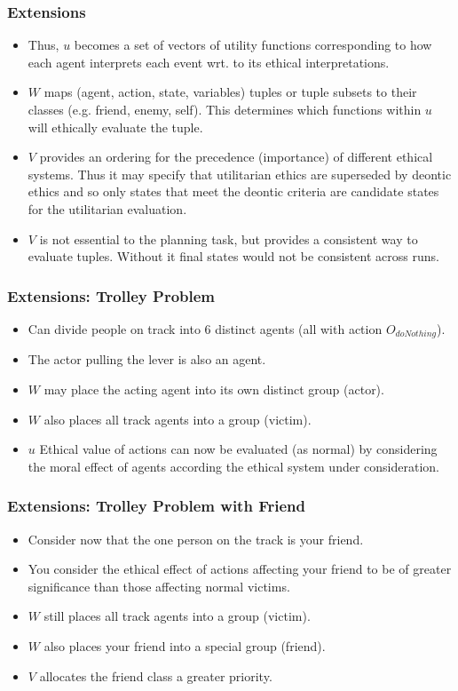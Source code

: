 \documentclass{beamer}
\begin{document}
 
 
\begin{frame}
\frametitle{Extensions}
\begin{itemize}

\item Thus, $u$ becomes a set of vectors of utility functions corresponding to how each agent interprets each event wrt. to its ethical interpretations.
\item $W$ maps (agent, action, state, variables) tuples or tuple subsets to their classes (e.g. friend, enemy, self). This determines which functions within $u$ will ethically evaluate the tuple.
\item $V$ provides an ordering for the precedence (importance) of different ethical systems. Thus it may specify that utilitarian ethics are superseded by deontic ethics and so only states that meet the deontic criteria are candidate states for the utilitarian evaluation.
\item $V$ is not essential to the planning task, but provides a consistent way to evaluate tuples. Without it final states would not be consistent across runs.
\end{itemize}
 \end{frame}
 
 
 \begin{frame}
\frametitle{Extensions: Trolley Problem}
\begin{itemize}
\item Can divide people on track into 6 distinct agents (all with action $O_{doNothing}$).
\item The actor pulling the lever is also an agent.
\item $W$ may place the acting agent into its own distinct group (actor).
\item $W$ also places all track agents into a group (victim).
\item $u$ Ethical value of actions can now be evaluated (as normal) by considering the moral effect of agents according the ethical system under consideration.
\end{itemize}
\end{frame}

 \begin{frame}
\frametitle{Extensions: Trolley Problem with Friend}
\begin{itemize}
\item Consider now that the one person on the track is your friend.
\item You consider the ethical effect of actions affecting your friend to be of greater significance than those affecting normal victims.
\item $W$ still places all track agents into a group (victim).
\item $W$ also places your friend into a special group (friend).
\item $V$ allocates the friend class a greater priority.

\end{itemize}

 \end{frame}
 
\end{document}
